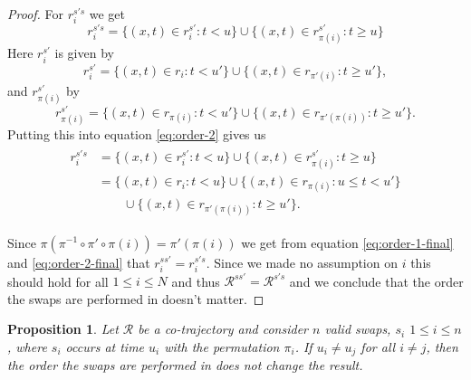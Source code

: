 \documentclass[12pt]{article}
\newcommand{\traj}{r}
\newcommand{\cotraj}{\mathcal{R}}
\newcommand{\swap}{s}
\newcommand{\swaptime}{u}
\newtheorem{proposition}{Proposition}
\theoremstyle{definition}
\begin{document}
\begin{proof}
  For \(\traj^{\swap'\swap}_{i}\) we get
  \begin{equation}
    \label{eq:order-2}
    \traj^{\swap'\swap}_{i} = \{(x, t) \in \traj^{\swap'}_{i}: t < u\}
    \cup \{(x, t) \in \traj^{\swap'}_{\pi(i)}: t \geq u\}
  \end{equation}
  Here \(\traj^{\swap'}_{i}\) is given by
  \begin{equation*}
    \traj^{\swap'}_{i} = \{(x, t) \in \traj_{i}: t < u'\}
    \cup \{(x, t) \in \traj_{\pi'(i)}: t \geq u'\},
  \end{equation*}
  and \(\traj^{\swap'}_{\pi(i)}\) by
  \begin{equation*}
    \traj^{\swap'}_{\pi(i)} = \{(x, t) \in \traj_{\pi(i)}: t < u'\}
    \cup \{(x, t) \in \traj_{\pi'(\pi(i))}: t \geq u'\}.
  \end{equation*}
  Putting this into equation \ref{eq:order-2} gives us
  \begin{align}
    \begin{split}
      \label{eq:order-2-final}
      \traj^{\swap'\swap}_{i} &= \{(x, t) \in \traj^{\swap'}_{i}: t < u\}
      \cup \{(x, t) \in \traj^{\swap'}_{\pi(i)}: t \geq u\}\\
      &= \{(x, t) \in \traj_{i}: t < u\}
      \cup \{(x, t) \in \traj_{\pi(i)}: u \leq t < u'\}\\
      &\qquad \cup \{(x, t) \in \traj_{\pi'(\pi(i))}: t \geq u'\}.
    \end{split}
  \end{align}

  Since \(\pi(\pi^{-1} \circ \pi' \circ \pi(i)) = \pi'(\pi(i))\) we
  get from equation \ref{eq:order-1-final} and \ref{eq:order-2-final}
  that \(\traj^{\swap\swap'}_{i} = \traj^{\swap'\swap}_{i}\). Since we
  made no assumption on \(i\) this should hold for all
  \(1 \leq i \leq N\) and thus
  \(\cotraj^{\swap\swap'} = \cotraj^{\swap'\swap}\) and we conclude
  that the order the swaps are performed in doesn't matter.
\end{proof}

\begin{proposition}
  \label{prop:swap-order}
  Let \(\cotraj\) be a co-trajectory and consider \(n\) valid swaps,
  \(\swap_{i}\) \(1 \leq i \leq n\), where \(\swap_{i}\) occurs at
  time \(\swaptime_{i}\) with the permutation \(\pi_{i}\). If
  \(\swaptime_{i} \not= \swaptime_{j}\) for all \(i \not= j\), then
  the order the swaps are performed in does not change the result.
\end{proposition}
\end{document}
